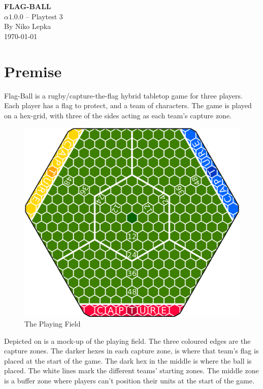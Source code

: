 \documentclass[a4paper]{book}
\begin{document}
\begin{titlepage}
\begin{center}
    \huge{\textbf{FLAG-BALL}}\\
    \LARGE{
        $\alpha1.0.0$ -- Playtest 3\\
        By Niko Lepka
    }\\
    \Large{\today}
\end{center}
\end{titlepage}
\thispagestyle{empty} %
\frontmatter %

\section*{Premise}
Flag-Ball is a rugby/capture-the-flag hybrid tabletop game for three players.
Each player has a flag to protect, and a team of characters.
The game is played on a hex-grid, with three of the sides acting as each team's capture zone.
\begin{figure}
    \centering
    \includegraphics[width=\textwidth]{graphics/board-2}
    \caption{The Playing Field}
    \label{fig:court}
\end{figure}
Depicted on  is a mock-up of the playing field.
The three coloured edges are the capture zones.
The darker hexes in each capture zone, is where that team's flag is placed at the start of the game.
The dark hex in the middle is where the ball is placed.
The white lines mark the different teams' starting zones.
The middle zone is a buffer zone where players can’t position their units at the start of the game.
\end{document}
